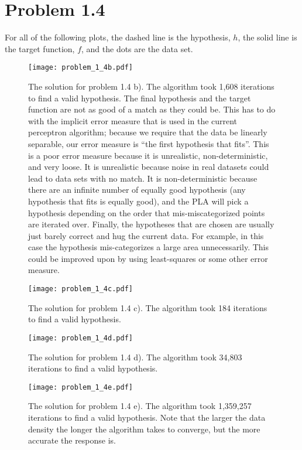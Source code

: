 \documentclass[11pt,letterpaper]{article}
\begin{document}
\section*{Problem 1.4}
For all of the following plots, the dashed line is the hypothesis, $h$, the solid line is the target function, $f$, and the dots are the data set.

\begin{figure}
	\centering
    \texttt{[image: problem\_1\_4b.pdf]}
	\caption{The solution for problem 1.4 b).  The algorithm took 1,608 iterations to find a valid hypothesis. The final hypothesis and the target function are not as good of a match as they could be.  This has to do with the implicit error measure that is used in the current perceptron algorithm; because we require that the data be linearly separable, our error measure is ``the first hypothesis that fits''.  This is a poor error measure because it is unrealistic, non-deterministic, and very loose.  It is unrealistic because noise in real datasets could lead to data sets with no match.  It is non-deterministic because there are an infinite number of equally good hypothesis (any hypothesis that fits is equally good), and the PLA will pick a hypothesis depending on the order that mis-miscategorized points are iterated over.  Finally, the hypotheses that are chosen are usually just barely correct and hug the current data.  For example, in this case the hypothesis mis-categorizes a large area unnecessarily.  This could be improved upon by using least-squares or some other error measure.}
\end{figure}

\begin{figure}
	\centering
    \texttt{[image: problem\_1\_4c.pdf]}
	\caption{The solution for problem 1.4 c).  The algorithm took 184 iterations to find a valid hypothesis.}
\end{figure}


\begin{figure}
	\centering
    \texttt{[image: problem\_1\_4d.pdf]}
	\caption{The solution for problem 1.4 d).  The algorithm took 34,803 iterations to find a valid hypothesis.}
\end{figure}


\begin{figure}
	\centering
    \texttt{[image: problem\_1\_4e.pdf]}
	\caption{The solution for problem 1.4 e).  The algorithm took 1,359,257 iterations to find a valid hypothesis.  Note that the larger the data density the longer the algorithm takes to converge, but the more accurate the response is.}
\end{figure}
\end{document}
